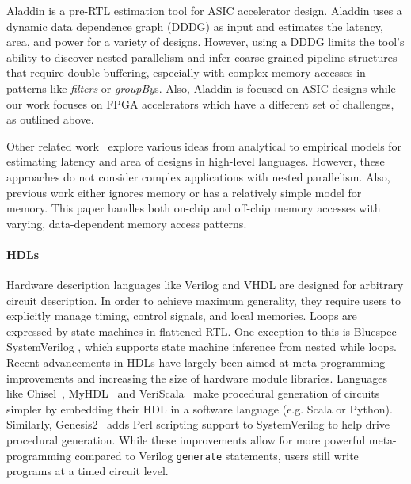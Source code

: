 Aladdin\cite{Aladdin} is a pre-RTL estimation tool for ASIC accelerator design.
Aladdin uses a dynamic data dependence graph (DDDG) as input and estimates the latency, area, and power
for a variety of designs. However, using a DDDG limits the tool's ability to discover nested parallelism
and infer coarse-grained pipeline structures that require double buffering, especially with complex
memory accesses in patterns like \emph{filters} or \emph{groupBy}s. Also, Aladdin is focused on ASIC designs
while our work focuses on FPGA accelerators which have a different set of challenges, as outlined above.

Other related work~\cite{Deng,Bilavarn,MatchEst,Enzler,Bjureus} explore various ideas from analytical to empirical
models for estimating latency and area of designs in high-level languages. However, these approaches do not
consider complex applications with nested parallelism. Also, previous work either ignores memory or has a relatively
simple model for memory. This paper handles both on-chip and off-chip memory accesses
with varying, data-dependent memory access patterns.


\paragraph{HDLs}
Hardware description languages like Verilog and VHDL are designed for arbitrary circuit description. In order to achieve maximum generality, they require users to explicitly manage timing, control signals, and local memories. Loops are expressed by state machines in flattened RTL.
One exception to this is Bluespec SystemVerilog \cite{bluespec}, which supports state machine inference from nested while loops.
Recent advancements in HDLs have largely been aimed at meta-programming improvements and increasing the size of hardware module libraries.
Languages like Chisel~\cite{chisel}, MyHDL~\cite{myhdl} and VeriScala~\cite{veriscala} make procedural generation of circuits simpler by embedding their HDL in a software language (e.g. Scala or Python). Similarly, Genesis2~\cite{genesis2} adds Perl scripting support to SystemVerilog to help drive procedural generation. While these improvements allow for more powerful meta-programming compared to Verilog \texttt{\small{generate}} statements, users still write programs at a timed circuit level.


